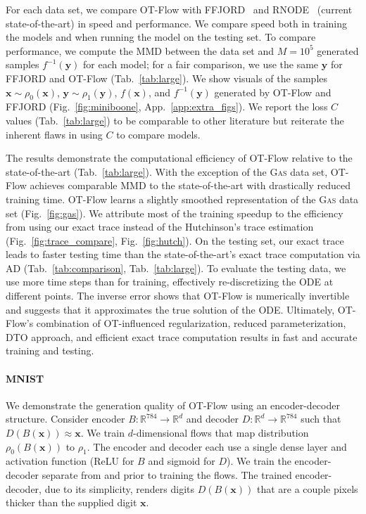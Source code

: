 \documentclass[letterpaper]{article}
\newcommand{\gas}{\textsc{Gas}}
\newcommand{\bfx}{\boldsymbol{x}}
\newcommand{\bfy}{\boldsymbol{y}}
\newcommand{\model}{OT-Flow} %
\newcommand{\R}{\ensuremath{\mathds{R}}}
\begin{document}
	For each data set, we compare \model{} with FFJORD~\cite{grathwohl2019ffjord} and RNODE~\cite{finlay2020train} (current state-of-the-art) in speed and performance.
	We compare speed both in training the models and when running the model on the testing set. To compare performance, we compute the MMD between the data set and $M{=}10^5$ generated samples $f^{-1}(\bfy)$ for each model; for a fair comparison, we use the same $\bfy$ for FFJORD and \model{} (Tab.~\ref{tab:large}). 
	We show visuals of the samples $\bfx\sim\rho_0(\bfx)$, $\bfy\sim\rho_1(\bfy)$, $f(\bfx)$, and $f^{-1}(\bfy)$ generated by \model{} and FFJORD  (Fig.~\ref{fig:miniboone}, App.~\ref{app:extra_figs}). We report the loss $C$ values (Tab.~\ref{tab:large}) to be comparable to other literature but reiterate the inherent flaws in using $C$ to compare models.
	
	The results demonstrate the computational efficiency of \model{} relative to the state-of-the-art (Tab.~\ref{tab:large}). With the exception of the \gas{} data set, \model{} achieves comparable MMD to the state-of-the-art with drastically reduced training time. 
	\model{} learns a slightly smoothed representation of the \gas{} data set (Fig.~\ref{fig:gas}).
	We attribute most of the training speedup to the efficiency from using our exact trace instead of the Hutchinson's trace estimation (Fig.~\ref{fig:trace_compare}, Fig.~\ref{fig:hutch}). 
	On the testing set, our exact trace leads to faster testing time than the state-of-the-art's exact trace computation via AD (Tab.~\ref{tab:comparison}, Tab.~\ref{tab:large}).
	To evaluate the testing data, we use more time steps than for training, effectively re-discretizing the ODE at different points. The inverse error shows that \model{} is numerically invertible and suggests that it approximates the true solution of the ODE.
    Ultimately, \model{}'s combination of OT-influenced regularization, reduced parameterization, DTO approach, and efficient exact trace computation results in fast and accurate training and testing.



\paragraph{MNIST}

	We demonstrate the generation quality of \model{} using an encoder-decoder structure.
	Consider encoder $B \colon \R^{784} \to \R^d$ and decoder $D \colon \R^d \to \R^{784}$ such that $D(B(\bfx)) \approx \bfx$.
	We train $d$-dimensional flows that map distribution $\rho_0(B(\bfx))$ to $\rho_1$. The encoder and decoder each use a single dense layer and activation function (ReLU for $B$ and sigmoid for $D$). We train the encoder-decoder separate from and prior to training the flows. The trained encoder-decoder, due to its simplicity, renders digits $D(B(\bfx))$ that are a couple pixels thicker than the supplied digit $\bfx$.  
	
\end{document}
